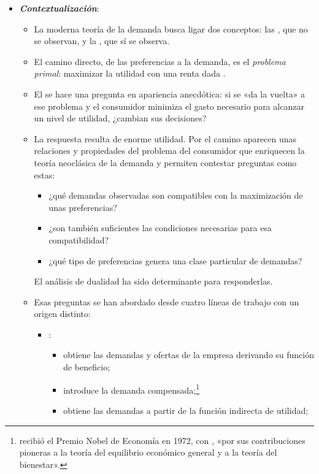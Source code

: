 \documentclass[11pt]{article}
\begin{document}
\begin{itemize}
\item \textbf{\emph{Contextualización}}:
  \begin{itemize}
  \item La moderna teoría de la demanda busca ligar dos conceptos: las , que no se observan, y la , que sí se observa.
  \item El camino directo, de las preferencias a la demanda, es el \emph{problema primal}: maximizar la utilidad con una renta dada .
  \item El  se hace una pregunta en apariencia anecdótica: si se «da la vuelta» a ese problema y el consumidor minimiza el gasto necesario para alcanzar un nivel de utilidad, ¿cambian sus decisiones?
  \item La respuesta resulta de enorme utilidad. Por el camino aparecen unas relaciones y propiedades del problema del consumidor que enriquecen la teoría neoclásica de la demanda y permiten contestar preguntas como estas:
    \begin{itemize}
    \item ¿qué demandas observadas son compatibles con la maximización de unas preferencias?
    \item ¿son también suficientes las condiciones necesarias para esa compatibilidad?
    \item ¿qué tipo de preferencias genera una clase particular de demandas?
    \end{itemize}
    El análisis de dualidad ha sido determinante para responderlas.
  \item Esas preguntas se han abordado desde cuatro líneas de trabajo con un origen distinto:
    \begin{itemize}
    \item {}:
      \begin{itemize}
      \item \textcite{Hotelling1932Edgeworth} obtiene las demandas y ofertas de la empresa derivando su función de beneficio;
      \item \textcite{Hicks1939Value} introduce la demanda compensada;\footnote{ recibió el Premio Nobel de Economía en 1972, con , «por sus contribuciones pioneras a la teoría del equilibrio económico general y a la teoría del bienestar»\nocite{Nobel1972HicksArrow}.}
      \item \textcite{Roy1947Distribution} obtiene las demandas a partir de la función indirecta de utilidad;

\end{itemize}
\end{itemize}
\end{itemize}
\end{itemize}
\end{document}
